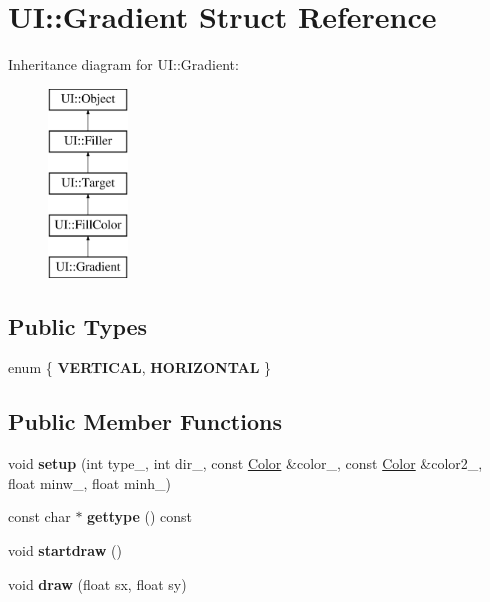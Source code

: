 \hypertarget{struct_u_i_1_1_gradient}{}\section{UI\+:\+:Gradient Struct Reference}
\label{struct_u_i_1_1_gradient}
Inheritance diagram for UI\+:\+:Gradient\+:\begin{figure}[H]
\begin{center}
\leavevmode
\includegraphics[height=5.000000cm]{struct_u_i_1_1_gradient}
\end{center}
\end{figure}
\subsection*{Public Types}
\begin{DoxyCompactItemize}
\item 
\mbox{\label{struct_u_i_1_1_gradient_aca8ffac687e767aad705d3d32946e563}} 
enum \{ {\bfseries V\+E\+R\+T\+I\+C\+AL}, 
{\bfseries H\+O\+R\+I\+Z\+O\+N\+T\+AL}
 \}
\end{DoxyCompactItemize}
\subsection*{Public Member Functions}
\begin{DoxyCompactItemize}
\item 
\mbox{\label{struct_u_i_1_1_gradient_a8e9b2513e77792b914edb0cce0b04461}} 
void {\bfseries setup} (int type\+\_\+, int dir\+\_\+, const \hyperlink{struct_u_i_1_1_color}{Color} \&color\+\_\+, const \hyperlink{struct_u_i_1_1_color}{Color} \&color2\+\_\+, float minw\+\_, float minh\+\_)
\item 
\mbox{\label{struct_u_i_1_1_gradient_a87018c7d7068c0db21445238c925134d}} 
const char $\ast$ {\bfseries gettype} () const
\item 
\mbox{\label{struct_u_i_1_1_gradient_a109cfab811a10d065bf4220f1f177060}} 
void {\bfseries startdraw} ()
\item 
\mbox{\label{struct_u_i_1_1_gradient_a868ea4a31d0d60d7abeb366b0d0f4c7a}} 
void {\bfseries draw} (float sx, float sy)
\end{DoxyCompactItemize}
